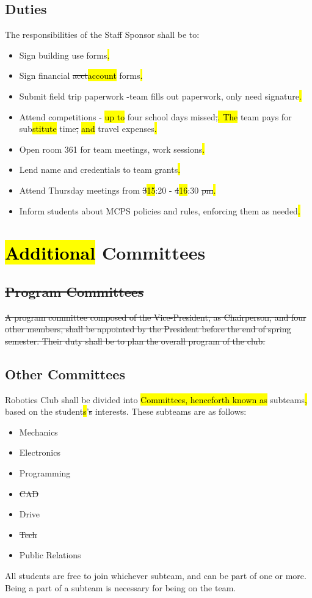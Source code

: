 \documentclass[12pt, a4paper]{article}
\begin{document}
\subsection{Duties}
The responsibilities of the Staff Sponsor shall be to:
\begin{itemize}
\item Sign building use forms\hl{.}
\item Sign financial \st{acct}\hl{account} forms\hl{.}
\item Submit field trip paperwork -team fills out paperwork, only need signature\hl{.}
\item Attend competitions - \hl{up to }four school days missed\st{;}\hl{. The} team pays for sub\hl{stitute} time\st{,} \hl{and} travel expenses\hl{.}
\item Open room 361 for team meetings, work sessions\hl{.}
\item Lend name and credentials to team grants\hl{.}
\item Attend Thursday meetings from \st{3}\hl{15}:20 - \st{4}\hl{16}:30 \st{pm}\hl{.}
\item Inform students about MCPS policies and rules, enforcing them as needed\hl{.}
\end{itemize}
\section{\hl{Additional} Committees}
\subsection{\st{Program Committees}}
\st{A program committee composed of the Vice-President, as Chairperson, and four other members, shall be appointed by the President before the end of spring semester. Their duty shall be to plan the overall program of the club.}
\subsection{Other Committees}
Robotics Club shall be divided into \hl{Committees, henceforth known as }subteams\hl{,} based on the student\hl{s}’\st{s} interests. These subteams are as follows:
\begin{itemize}
\item Mechanics
\item Electronics
\item Programming
\item \st{CAD}
\item Drive
\item \st{Tech}
\item Public Relations
\end{itemize}
All students are free to join whichever subteam, and can be part of one or more. Being a part of a subteam is necessary for being on the team.
\end{document}
